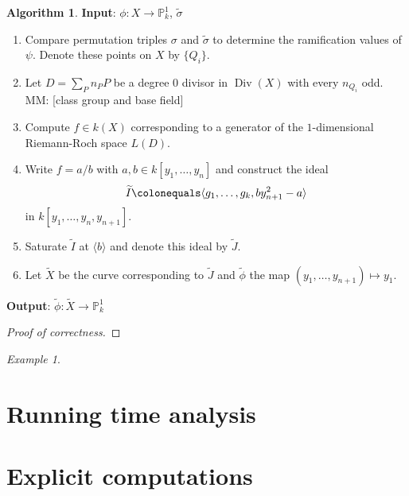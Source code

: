 \documentclass{dcthesis}
\newcommand{\PP}{\mathbb P}
\newcommand{\mm}[1]{{\color{blue} \sf MM: [#1]}}
\newcommand{\wt}[1]{\widetilde{#1}}
\DeclareMathOperator{\Div}{Div}
\theoremstyle{definition}
\newtheorem{alg}[prop]{Algorithm}
\theoremstyle{remark}
\newtheorem{example}[prop]{Example}
\begin{document}
{{\begin{alg}
      \newline
      \textbf{Input}: $\phi:X\to\PP^1_k$, $\wt{\sigma}$
      \begin{enumerate}
        \item
          Compare permutation triples $\sigma$ and $\wt{\sigma}$
          to determine the ramification values of $\psi$.
          Denote these points on $X$ by $\{Q_i\}$.
        \item
          Let $D = \sum_{P}n_PP$ be a degree $0$ divisor in
          $\Div(X)$ with every $n_{Q_i}$ odd.
          \mm{class group and base field}
        \item
          Compute $f\in k(X)$ corresponding to a generator
          of the $1$-dimensional Riemann-Roch space $L(D)$.
        \item
          Write $f=a/b$ with $a,b\in k[y_1,\dots,y_n]$ and construct the ideal
          \[
            \wt{I}\colonequals\langle g_1,\dots,g_k, by_{n+1}^2-a\rangle
          \]
          in $k[y_1,\dots,y_n,y_{n+1}]$.
        \item
          Saturate $\wt{I}$ at $\langle b\rangle$ and denote this ideal by $\wt{J}$.
        \item
          Let $\wt{X}$ be the curve corresponding to $\wt{J}$ and
          $\wt{\phi}$ the map $(y_1,\dots,y_{n+1})\mapsto y_1$.
      \end{enumerate}
      \textbf{Output}: $\wt{\phi}:\wt{X}\to\PP^1_k$
    \end{alg}
    \begin{proof}[Proof of correctness]
    \end{proof}
    \begin{example}
    \end{example}
  }
  \section{Running time analysis}{\label{sec:runtime}
  }
  \section{Explicit computations}{\label{sec:computations}
  }
}

\backmatter




\end{document}

